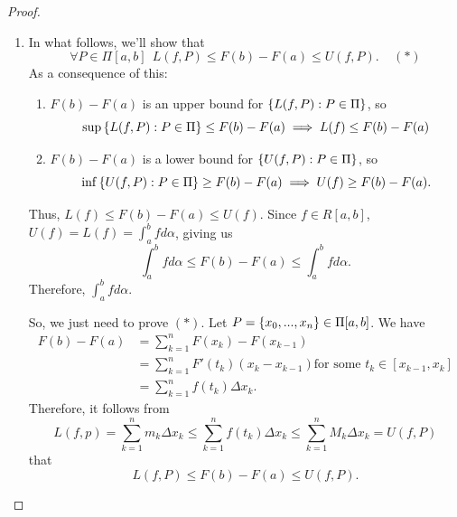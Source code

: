 \begin{proof}
    \begin{enumerate}
        \item In what follows, we'll show that
        $$\forall P \in \Pi[a,b] ~~L(f, P) \leq F(b) - F(a) \leq U(f, P). ~~~~~(*)$$
        As a consequence of this:
        \begin{enumerate}
            \item[(I)] $F(b) - F(a)$ is an upper bound for $\left\{L(f, P) : P \in \Pi\right\}$, so 
            $$\sup\left\{L(f, P) : P \in \Pi\right\}\leq F(b) - F(a) \implies L(f) \leq F(b) - F(a)$$
            \item[(II)] $F(b)- F(a)$ is a lower bound for $\left\{U(f, P) : P \in \Pi\right\}$, so 
            $$\inf \left\{U(f, P) : P \in \Pi\right\} \geq F(b) - F(a) \implies U(f) \geq F(b) - F(a).$$
        \end{enumerate}
        Thus, $L(f) \leq F(b) - F(a) \leq U(f)$. Since $f \in R[a,b]$, $U(f) = L(f) = \int_a^b f d\alpha$, giving us
        $$\int_a^b f d\alpha \leq F(b) - F(a) \leq \int_a^b f d\alpha.$$
        Therefore, $\int_a^b f d\alpha$.

        So, we just need to prove $(*)$. Let $P=\left\{x_0,..., x_n\right\} \in \Pi[a,b]$. We have 
        \begin{align*}
            F(b) - F(a) &= \sum_{k=1}^{n}F(x_k) - F(x_{k-1}) \\
            &= \sum_{k=1}^{n}F'(t_k)(x_k - x_{k-1}) \text{for some $t_k \in [x_{k-1}, x_k]$} \tag{MVT for derivatives} \\
            &= \sum_{k=1}^{n}f(t_k) \Delta x_k.
        \end{align*}
        Therefore, it follows from 
        $$L(f, p) = \sum_{k=1}^{n}m_k \Delta x_k \leq \sum_{k=1}^{n}f(t_k)\Delta x_k \leq \sum_{k=1}^{n}M_k \Delta x_k = U(f, P)$$
        that
        $$L(f,P) \leq F(b) - F(a) \leq U(f, P).$$


\end{enumerate}
\end{proof}

